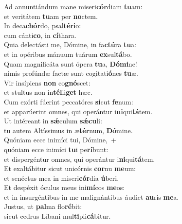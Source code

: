 \evenverse Ad annuntiándum mane miseri\textbf{cór}diam \textbf{tu}am:~\*\\
\evenverse et veritátem \textbf{tu}am per \textbf{no}ctem.\\
\oddverse In deca\textbf{chór}do, psal\textbf{té}\textbf{ri}o:~\*\\
\oddverse cum cánti\textbf{co}, in \textbf{cí}thara.\\
\evenverse Quia delectásti me, Dómine, in fa\textbf{ctú}ra \textbf{tu}a:~\*\\
\evenverse et in opéribus mánuum tuárum \textbf{ex}sul\textbf{tá}bo.\\
\oddverse Quam magnificáta sunt ópera \textbf{tu}a, \textbf{Dó}\textbf{mi}ne!~\*\\
\oddverse nimis profúndæ factæ sunt cogitati\textbf{ó}nes \textbf{tu}æ.\\
\evenverse Vir insípiens \textbf{non} co\textbf{gnó}scet:~\*\\
\evenverse et stultus non in\textbf{tél}li\textbf{get} hæc.\\
\oddverse Cum exórti fúerint peccatóres \textbf{si}cut \textbf{fe}num:~\*\\
\oddverse et apparúerint omnes, qui operántur i\textbf{ni}qui\textbf{tá}tem.\\
\evenverse Ut intéreant in \textbf{sǽ}culum \textbf{sǽ}\textbf{cu}li:~\*\\
\evenverse tu autem Altíssimus in æ\textbf{tér}num, \textbf{Dó}mine.\\
\oddverse Quóniam ecce inimíci tui, Dómine,~+\\
\oddverse  quóniam ecce inimíci \textbf{tu}i pe\textbf{rí}bunt:~\*\\
\oddverse et dispergéntur omnes, qui operántur i\textbf{ni}qui\textbf{tá}tem.\\
\evenverse Et exaltábitur sicut unicórnis \textbf{cor}nu \textbf{me}um:~\*\\
\evenverse et senéctus mea in miseri\textbf{cór}dia \textbf{ú}beri.\\
\oddverse Et despéxit óculus meus ini\textbf{mí}cos \textbf{me}os:~\*\\
\oddverse et in insurgéntibus in me malignántibus áudiet \textbf{au}ris \textbf{me}a.\\
\evenverse Justus, ut \textbf{pal}ma flo\textbf{ré}bit:~\*\\
\evenverse sicut cedrus Líbani mul\textbf{ti}pli\textbf{cá}bitur.\\
